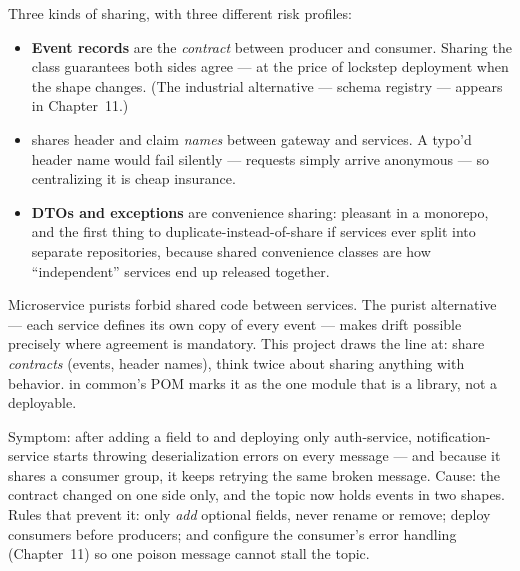 Three kinds of sharing, with three different risk profiles:

\begin{itemize}
  \item \textbf{Event records} are the \emph{contract} between producer
  and consumer. Sharing the class guarantees both sides agree --- at the
  price of lockstep deployment when the shape changes. (The industrial
  alternative --- schema registry --- appears in Chapter~11.)
  \item \textbf{} shares header and claim \emph{names}
  between gateway and services. A typo'd header name would fail silently
  --- requests simply arrive anonymous --- so centralizing it is cheap
  insurance.
  \item \textbf{DTOs and exceptions} are convenience sharing: pleasant in
  a monorepo, and the first thing to duplicate-instead-of-share if
  services ever split into separate repositories, because shared
  convenience classes are how ``independent'' services end up released
  together.
\end{itemize}

\begin{decision}
Microservice purists forbid shared code between services. The purist
alternative --- each service defines its own copy of every event --- makes
drift possible precisely where agreement is mandatory. This project
draws the line at: share \emph{contracts} (events, header names), think
twice about sharing anything with behavior.  in
common's POM marks it as the one module that is a library, not a
deployable.
\end{decision}

\begin{pitfall}
Symptom: after adding a field to  and deploying
only auth-service, notification-service starts throwing deserialization
errors on every message --- and because it shares a consumer group, it
keeps retrying the same broken message. Cause: the contract changed on
one side only, and the topic now holds events in two shapes. Rules that
prevent it: only \emph{add} optional fields, never rename or remove;
deploy consumers before producers; and configure the consumer's error
handling (Chapter~11) so one poison message cannot stall the topic.
\end{pitfall}

